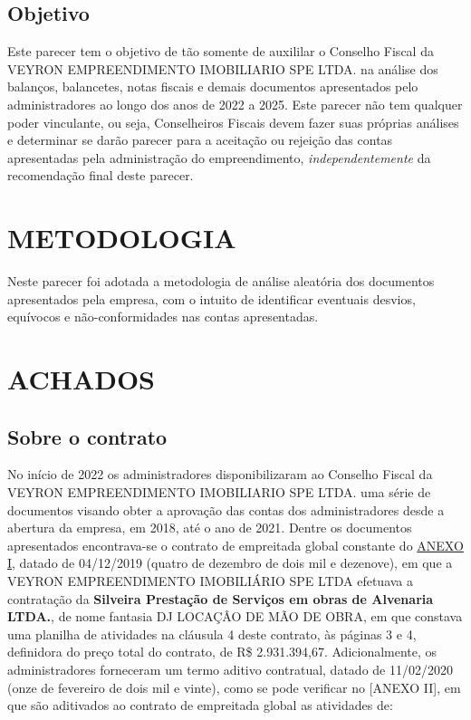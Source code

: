 \documentclass[
  letterpaper,
  DIV=11,
  numbers=noendperiod]{scrreprt}
\begin{document}
\section{Objetivo}\label{objetivo}

Este parecer tem o objetivo de tão somente de auxililar o Conselho
Fiscal da VEYRON EMPREENDIMENTO IMOBILIARIO SPE LTDA. na análise dos
balanços, balancetes, notas fiscais e demais documentos apresentados
pelo administradores ao longo dos anos de 2022 a 2025. Este parecer não
tem qualquer poder vinculante, ou seja, Conselheiros Fiscais devem fazer
suas próprias análises e determinar se darão parecer para a aceitação ou
rejeição das contas apresentadas pela administração do empreendimento,
\emph{independentemente} da recomendação final deste parecer.


\chapter{METODOLOGIA}\label{metodologia}

Neste parecer foi adotada a metodologia de análise aleatória dos
documentos apresentados pela empresa, com o intuito de identificar
eventuais desvios, equívocos e não-conformidades nas contas
apresentadas.


\chapter{ACHADOS}\label{achados}

\section{Sobre o contrato}\label{sobre-o-contrato}

No início de 2022 os administradores disponibilizaram ao Conselho Fiscal
da VEYRON EMPREENDIMENTO IMOBILIARIO SPE LTDA. uma série de documentos
visando obter a aprovação das contas dos administradores desde a
abertura da empresa, em 2018, até o ano de 2021. Dentre os documentos
apresentados encontrava-se o contrato de empreitada global constante do
\hyperref[anexo-i]{ANEXO I}, datado de 04/12/2019 (quatro de dezembro de
dois mil e dezenove), em que a VEYRON EMPREENDIMENTO IMOBILIÁRIO SPE
LTDA efetuava a contratação da \textbf{Silveira Prestação de Serviços em
obras de Alvenaria LTDA.}, de nome fantasia DJ LOCAÇÂO DE MÃO DE OBRA,
em que constava uma planilha de atividades na cláusula 4 deste contrato,
às páginas 3 e 4, definidora do preço total do contrato, de R\$
2.931.394,67. Adicionalmente, os administradores forneceram um termo
aditivo contratual, datado de 11/02/2020 (onze de fevereiro de dois mil
e vinte), como se pode verificar no {[}ANEXO II{]}, em que são
aditivados ao contrato de empreitada global as atividades de:
\end{document}
